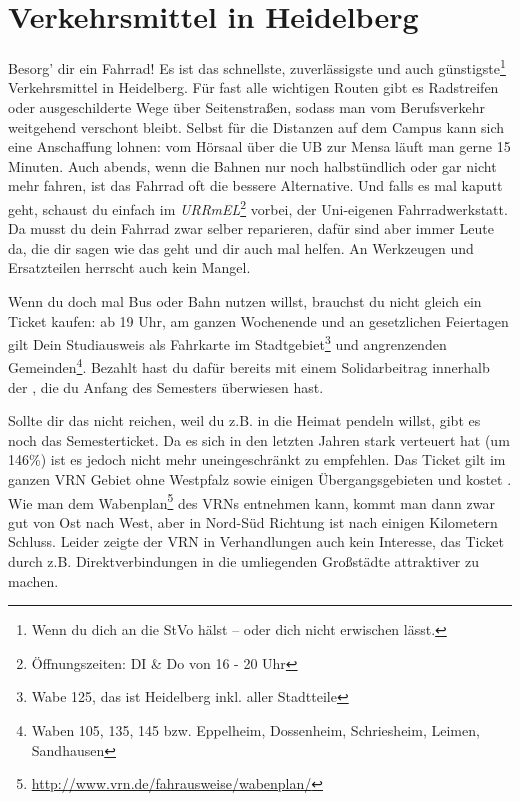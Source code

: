 \section{Verkehrsmittel in Heidelberg}
\label{verkehrsmittel}
Besorg' dir ein Fahrrad! Es ist das schnellste, zuverlässigste und auch günstigste\footnote{Wenn du dich an die StVo hälst -- oder dich nicht erwischen lässt.} Verkehrsmittel in Heidelberg. Für fast alle wichtigen Routen gibt es Radstreifen oder ausgeschilderte Wege über Seitenstraßen, sodass man vom Berufsverkehr weitgehend verschont bleibt. Selbst für die Distanzen auf dem Campus kann sich eine Anschaffung lohnen: vom Hörsaal über die \gls{UB} zur Mensa läuft man gerne 15 Minuten. Auch abends, wenn die Bahnen nur noch halbstündlich oder gar nicht mehr fahren, ist das Fahrrad oft die bessere Alternative. Und falls es mal kaputt geht, schaust du einfach im \emph{URRmEL}\footnote{Öffnungszeiten: DI \& Do von 16 - 20 Uhr} vorbei, der Uni-eigenen Fahrradwerkstatt. Da musst du dein Fahrrad zwar selber reparieren, dafür sind aber immer Leute da, die dir sagen wie das geht und dir auch mal helfen. An Werkzeugen und Ersatzteilen herrscht auch kein Mangel.

Wenn du doch mal Bus oder Bahn nutzen willst, brauchst du nicht gleich ein Ticket kaufen: ab 19 Uhr, am ganzen Wochenende und an gesetzlichen Feiertagen gilt Dein Studiausweis als Fahrkarte im Stadtgebiet\footnote{Wabe 125, das ist Heidelberg inkl. aller Stadtteile} und angrenzenden Gemeinden\footnote{Waben 105, 135, 145 bzw. Eppelheim, Dossenheim, Schriesheim, Leimen, Sandhausen}. Bezahlt hast du dafür bereits mit einem Solidarbeitrag innerhalb der \EUR{\beitragssumme}, die du Anfang des Semesters überwiesen hast.

Sollte dir das nicht reichen, weil du z.B. in die Heimat pendeln willst, gibt es noch das Semesterticket. Da es sich in den letzten Jahren stark verteuert hat (um 146\%) ist es jedoch nicht mehr uneingeschränkt zu empfehlen. Das Ticket gilt im ganzen VRN Gebiet ohne Westpfalz sowie einigen Übergangsgebieten und kostet \EUR{\semesterticket}. Wie man dem Wabenplan\footnote{\url{http://www.vrn.de/fahrausweise/wabenplan/}} des \glspl{VRN} entnehmen kann, kommt man dann zwar gut von Ost nach West, aber in Nord-Süd Richtung ist nach einigen Kilometern Schluss. Leider zeigte der \gls{VRN} in Verhandlungen auch kein Interesse, das Ticket durch z.B. Direktverbindungen in die umliegenden Großstädte attraktiver zu machen.


